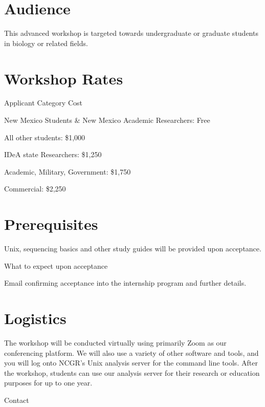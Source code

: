 \documentclass[
]{book}
\begin{document}
\hypertarget{audience-3}{%
\section*{Audience}\label{audience-3}}

This advanced workshop is targeted towards undergraduate or graduate students in biology or related fields.

\hypertarget{workshop-rates-3}{%
\section*{Workshop Rates}\label{workshop-rates-3}}

Applicant Category Cost

New Mexico Students \& New Mexico Academic Researchers:
Free

All other students:
\$1,000

IDeA state Researchers:
\$1,250

Academic, Military, Government:
\$1,750

Commercial:
\$2,250

\hypertarget{prerequisites-3}{%
\section*{Prerequisites}\label{prerequisites-3}}

Unix, sequencing basics and other study guides will be provided upon acceptance.

What to expect upon acceptance

Email confirming acceptance into the internship program and further details.

\hypertarget{logistics-3}{%
\section*{Logistics}\label{logistics-3}}

The workshop will be conducted virtually using primarily Zoom as our conferencing platform. We will also use a variety of other software and tools, and you will log onto NCGR's Unix analysis server for the command line tools. After the workshop, students can use our analysis server for their research or education purposes for up to one year.

Contact
\end{document}
